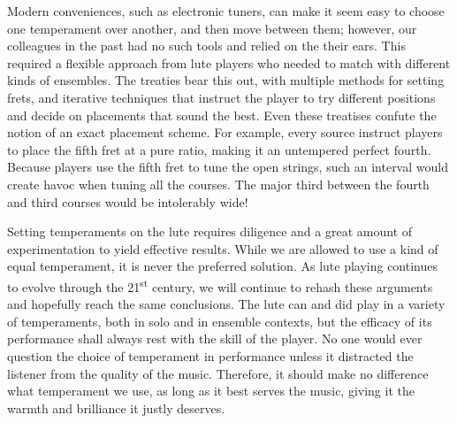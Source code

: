 Modern conveniences, such as electronic tuners, can make it seem easy to choose one temperament over
another, and then move between them; however, our colleagues in the past had no such tools and
relied on the their ears.  This required a flexible approach from lute players who needed to match
with different kinds of ensembles.  The treaties bear this out, with multiple methods for setting
frets, and iterative techniques that instruct the player to try different positions and decide on
placements that sound the best.  Even these treatises confute the notion of an exact placement
scheme. For example, every source instruct players to place the fifth fret at a pure ratio, making
it an untempered perfect fourth.  Because players use the fifth fret to tune the open strings, such
an interval would create havoc when tuning all the courses. The major third between the fourth and
third courses would be intolerably wide!

Setting temperaments on the lute requires diligence and a great amount of experimentation to yield
effective results.  While we are allowed to use a kind of equal temperament, it is never the
preferred solution.  As lute playing continues to evolve through the 21\textsuperscript{st} century,
we will continue to rehash these arguments and hopefully reach the same conclusions. The lute can
and did play in a variety of temperaments, both in solo and in ensemble contexts, but the efficacy
of its performance shall always rest with the skill of the player. No one would ever question the
choice of temperament in performance unless it distracted the listener from the quality of the
music.  Therefore, it should make no difference what temperament we use, as long as it best serves
the music, giving it the warmth and brilliance it justly deserves.
